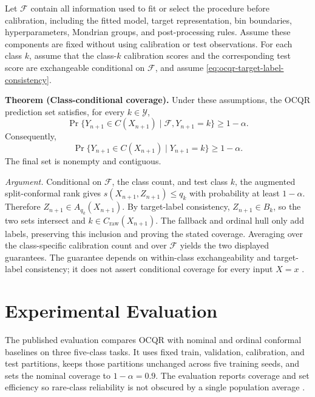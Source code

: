 \documentclass[12pt]{report}
\begin{document}
Let \(\mathcal{F}\) contain all information used to fit or select the procedure before calibration, including the fitted model, target representation, bin boundaries, hyperparameters, Mondrian groups, and post-processing rules. Assume these components are fixed without using calibration or test observations. For each class \(k\), assume that the class-\(k\) calibration scores and the corresponding test score are exchangeable conditional on \(\mathcal{F}\), and assume \cref{eq:ocqr-target-label-consistency}.

\noindent\textbf{Theorem (Class-conditional coverage).} Under these assumptions, the OCQR prediction set satisfies, for every \(k\in\mathcal{Y}\),
\begin{equation}
\Pr\{Y_{n+1}\in C(X_{n+1})\mid\mathcal{F},Y_{n+1}=k\}
\geq 1-\alpha.
\label{eq:ocqr-conditional-coverage}
\end{equation}
Consequently,
\begin{equation}
\Pr\{Y_{n+1}\in C(X_{n+1})\mid Y_{n+1}=k\}
\geq 1-\alpha.
\label{eq:ocqr-marginalized-conditional-coverage}
\end{equation}
The final set is nonempty and contiguous.

\noindent\textit{Argument.} Conditional on \(\mathcal{F}\), the class count, and test class \(k\), the augmented split-conformal rank gives \(s(X_{n+1},Z_{n+1})\leq q_k\) with probability at least \(1-\alpha\). Therefore \(Z_{n+1}\in A_{q_k}(X_{n+1})\). By target-label consistency, \(Z_{n+1}\in B_k\), so the two sets intersect and \(k\in C_{\mathrm{raw}}(X_{n+1})\). The fallback and ordinal hull only add labels, preserving this inclusion and proving the stated coverage. Averaging over the class-specific calibration count and over \(\mathcal{F}\) yields the two displayed guarantees. The guarantee depends on within-class exchangeability and target-label consistency; it does not assert conditional coverage for every input \(X=x\) \citep{hong2026ocqr}.

\section{Experimental Evaluation}

The published evaluation compares OCQR with nominal and ordinal conformal baselines on three five-class tasks. It uses fixed train, validation, calibration, and test partitions, keeps those partitions unchanged across five training seeds, and sets the nominal coverage to \(1-\alpha=0.9\). The evaluation reports coverage and set efficiency so rare-class reliability is not obscured by a single population average \citep{hong2026ocqr}.
\end{document}
